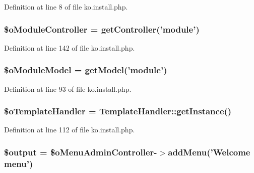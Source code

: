 Definition at line 8 of file ko.\+install.\+php.

\hypertarget{ko_8install_8php_aaae9128654f5054258982d94a0566987}{
\subsubsection[{\$o\+Module\+Controller}]{\setlength{\rightskip}{0pt plus 5cm}\$o\+Module\+Controller = {\bf get\+Controller}('{\bf module}')}}\label{ko_8install_8php_aaae9128654f5054258982d94a0566987}


Definition at line 142 of file ko.\+install.\+php.

\hypertarget{ko_8install_8php_a8d7a87df524e7d6938f66f8e284cdd1e}{
\subsubsection[{\$o\+Module\+Model}]{\setlength{\rightskip}{0pt plus 5cm}\$o\+Module\+Model = {\bf get\+Model}('{\bf module}')}}\label{ko_8install_8php_a8d7a87df524e7d6938f66f8e284cdd1e}


Definition at line 93 of file ko.\+install.\+php.

\hypertarget{ko_8install_8php_abd57e3ab220291ea9b5c16c2a4e0670e}{
\subsubsection[{\$o\+Template\+Handler}]{\setlength{\rightskip}{0pt plus 5cm}\$o\+Template\+Handler = {\bf Template\+Handler\+::get\+Instance}()}}\label{ko_8install_8php_abd57e3ab220291ea9b5c16c2a4e0670e}


Definition at line 112 of file ko.\+install.\+php.

\hypertarget{ko_8install_8php_a73004ce9cd673c1bfafd1dc351134797}{
\subsubsection[{\$output}]{\setlength{\rightskip}{0pt plus 5cm}\$output = \$o\+Menu\+Admin\+Controller-\/$>$add\+Menu('Welcome {\bf menu}')}}\label{ko_8install_8php_a73004ce9cd673c1bfafd1dc351134797}



